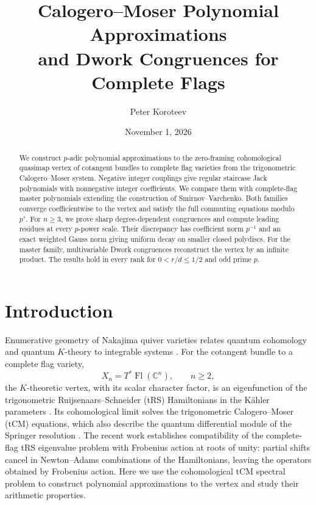 \documentclass[11pt]{amsart}
\title[Calogero--Moser Approximations for Complete Flags]{Calogero--Moser Polynomial Approximations\texorpdfstring{\\}{ }and Dwork Congruences for Complete Flags}
\author{Peter Koroteev}
\date{November 1, 2026}
\theoremstyle{definition}
\theoremstyle{remark}
\numberwithin{equation}{section}
\newcommand{\C}{\mathbb C}
\DeclareMathOperator{\Fl}{Fl}
\begin{document}
\begin{abstract}
We construct $p$-adic polynomial approximations to the zero-framing
cohomological quasimap vertex of cotangent bundles to complete flag varieties from the
trigonometric Calogero--Moser system. Negative integer couplings
give regular staircase Jack polynomials with nonnegative integer
coefficients. We compare them with complete-flag master
polynomials extending the construction of Smirnov--Varchenko.
Both families converge coefficientwise to the vertex and satisfy
the full commuting equations modulo $p^s$. For $n\geq3$, we
prove sharp degree-dependent congruences and compute leading
residues at every $p$-power scale. Their discrepancy has
coefficient norm $p^{-1}$ and an exact weighted Gauss norm giving
uniform decay on smaller closed polydiscs. For the master
family, multivariable Dwork congruences reconstruct the vertex
by an infinite product. The results hold in every rank
for $0<r/d\leq1/2$ and odd prime $p$.
\end{abstract}
\maketitle
\setcounter{tocdepth}{1}
\tableofcontents

\section{Introduction}
\label{sec:introduction}
Enumerative geometry of Nakajima quiver varieties relates quantum
cohomology and quantum $K$-theory to integrable systems
\cites{Nak94,MO19,KPSZ21,K23}. For the cotangent bundle to a
complete flag variety,
\[
 X_n=T^*\Fl(\C^n),\qquad n\geq2,
\]
the $K$-theoretic vertex, with its scalar character factor, is an
eigenfunction of the trigonometric
Ruijsenaars--Schneider (tRS) Hamiltonians in the K\"ahler
parameters \cite{K21,Din21}. Its cohomological limit solves the
trigonometric Calogero--Moser (tCM) equations, which also describe
the quantum differential module of the Springer resolution
\cite{BMO11}.
The recent work \cite{K26} establishes compatibility of the
complete-flag tRS eigenvalue problem with Frobenius action at
roots of unity: partial shifts cancel in Newton--Adams
combinations of the Hamiltonians, leaving the operators obtained
by Frobenius action. Here we use the cohomological tCM spectral
problem to construct polynomial approximations to the vertex
and study their arithmetic properties.
\end{document}
